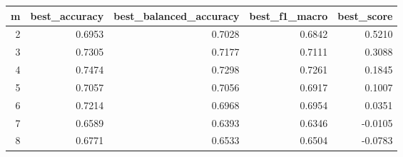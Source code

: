 \begin{tabular}{rrrrr}
\toprule
m & best\_accuracy & best\_balanced\_accuracy & best\_f1\_macro & best\_score \\
\midrule
2 & 0.6953 & 0.7028 & 0.6842 & 0.5210 \\
3 & 0.7305 & 0.7177 & 0.7111 & 0.3088 \\
4 & 0.7474 & 0.7298 & 0.7261 & 0.1845 \\
5 & 0.7057 & 0.7056 & 0.6917 & 0.1007 \\
6 & 0.7214 & 0.6968 & 0.6954 & 0.0351 \\
7 & 0.6589 & 0.6393 & 0.6346 & -0.0105 \\
8 & 0.6771 & 0.6533 & 0.6504 & -0.0783 \\
\bottomrule
\end{tabular}
